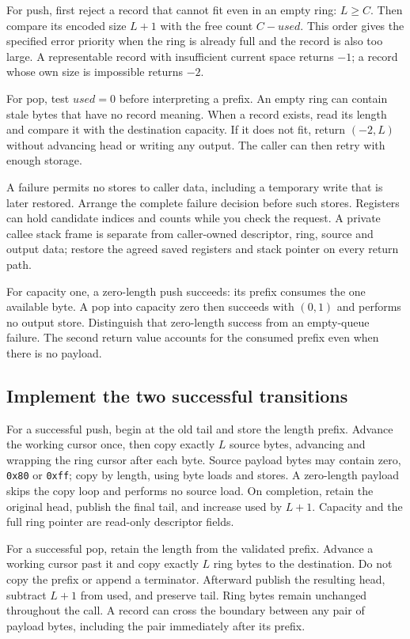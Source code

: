 For push, first reject a record that cannot fit even in an empty ring: $L\geq C$.
Then compare its encoded size $L+1$ with the free count $C-used$. This order gives
the specified error priority when the ring is already full and the record is also
too large. A representable record with insufficient current space returns $-1$;
a record whose own size is impossible returns $-2$.

For pop, test $used=0$ before interpreting a prefix. An empty ring can contain stale
bytes that have no record meaning. When a record exists, read its length and compare
it with the destination capacity. If it does not fit, return $(-2,L)$ without
advancing head or writing any output. The caller can then retry with enough storage.

A failure permits no stores to caller data, including a temporary write that is
later restored. Arrange the complete failure decision before such stores. Registers
can hold candidate indices and counts while you check the request. A private callee
stack frame is separate from caller-owned descriptor, ring, source and output data;
restore the agreed saved registers and stack pointer on every return path.

For capacity one, a zero-length push succeeds: its prefix consumes the one available
byte. A pop into capacity zero then succeeds with $(0,1)$ and performs no output
store. Distinguish that zero-length success from an empty-queue failure. The second
return value accounts for the consumed prefix even when there is no payload.

\subsection*{Implement the two successful transitions}

For a successful push, begin at the old tail and store the length prefix. Advance
the working cursor once, then copy exactly $L$ source bytes, advancing and wrapping
the ring cursor after each byte. Source payload bytes may contain zero,
\texttt{0x80} or \texttt{0xff}; copy by length, using byte loads and stores.
A zero-length payload skips the copy loop and performs no source load. On completion,
retain the original head, publish the final tail, and increase used by $L+1$.
Capacity and the full ring pointer are read-only descriptor fields.

For a successful pop, retain the length from the validated prefix. Advance a working
cursor past it and copy exactly $L$ ring bytes to the destination. Do not copy the
prefix or append a terminator. Afterward publish the resulting head, subtract $L+1$
from used, and preserve tail. Ring bytes remain unchanged throughout the call. A
record can cross the boundary between any pair of payload bytes, including the
pair immediately after its prefix.

